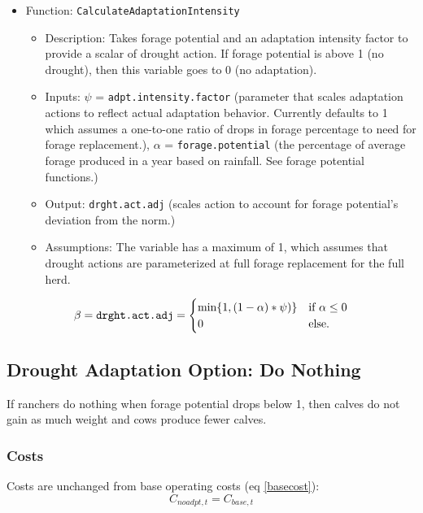\documentclass[11pt]{article}
\begin{document}
\begin{itemize}
\item Function: \verb!CalculateAdaptationIntensity!
	\begin{itemize}
	\item Description: Takes forage potential and an adaptation intensity factor to provide a scalar of drought action. If forage potential is above 1 (no drought), then this variable goes to 0 (no adaptation). 
	\item Inputs: \(\psi\) = \verb!adpt.intensity.factor! (parameter that scales adaptation actions to reflect actual adaptation behavior. Currently defaults to 1 which assumes a one-to-one ratio of drops in forage percentage to need for forage replacement.), \(\alpha\) = \verb!forage.potential! (the percentage of average forage produced in a year based on rainfall. See forage potential functions.)
	\item Output: \verb!drght.act.adj! (scales action to account for forage potential's deviation from the norm.)
	\item Assumptions: The variable has a maximum of 1, which assumes that drought actions are parameterized at full forage replacement for the full herd.
	\end{itemize}
\end{itemize}

\begin{equation} \label{intens}
\beta = \verb!drght.act.adj!=
\begin{cases}
\min\{1,(1-\alpha)*\psi)\} & \text{if}\ \alpha \le 0 \\
0 & \text{else}.
\end{cases}
\end{equation}


\subsection{Drought Adaptation Option: Do Nothing}
If ranchers do nothing when forage potential drops below 1, then calves do not gain as much weight and cows produce fewer calves. 

\subsubsection{Costs}
Costs are unchanged from base operating costs (eq \ref{basecost}):
\begin{equation}
C_{noadpt,t} = C_{base,t}
\end{equation}
\end{document}
